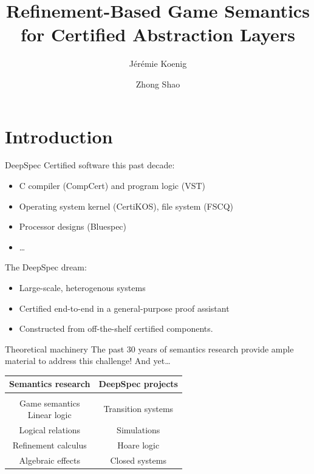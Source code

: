 \documentclass{beamer}
\title{Refinement-Based Game Semantics for
  Certified Abstraction Layers}
\author{J\'er\'emie Koenig \and Zhong Shao}
\begin{document}
\begin{frame}
\titlepage
\end{frame}

\section{Introduction} %

\begin{frame}{DeepSpec} %
  Certified software this past decade:
  \begin{itemize}
    \item C compiler (CompCert) \pause and program logic (VST)
    \pause \item Operating system kernel (CertiKOS)\pause , file system (FSCQ)
    \pause \item Processor designs (Bluespec)
    \pause \item \ldots
  \end{itemize}

  \pause
  The DeepSpec dream:
  \begin{itemize}
    \item Large-scale, heterogenous systems
    \item Certified end-to-end in a general-purpose proof assistant
    \item Constructed from off-the-shelf certified components.
  \end{itemize}
\end{frame}

\begin{frame}{Theoretical machinery} %
  The past 30 years of semantics research
  provide ample material to address this challenge!
  And yet\ldots

  \pause
  \vfill
  \begin{centering}
    \begin{tabular}{cc}
      \hline
      Semantics research &
      DeepSpec projects
      \\
      \hline
      \\
      \pause
      \parbox{.45\textwidth}{
        \centering
        Game semantics \\ Linear logic
      } &
      \pause
      \parbox{.45\textwidth}{
        \centering
        Transition systems
      } \\[1.5em]
      \pause
      Logical relations &
      \pause
      Simulations \\[1.5em]
      \pause
      Refinement calculus &
      \pause
      Hoare logic \\[1.5em]
      \pause
      Algebraic effects &
      \pause
      Closed systems \pause \\[1.5em]
      \hline
    \end{tabular}
  \end{centering}
\end{frame}
\end{document}
